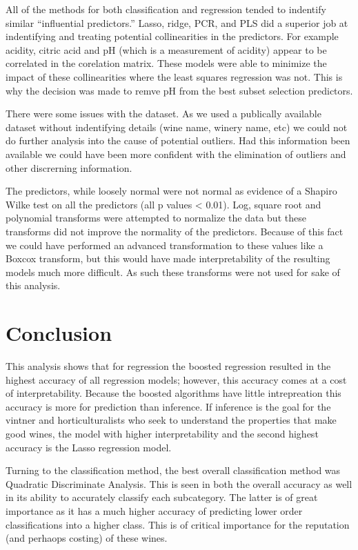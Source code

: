 \documentclass[]{article}
\begin{document}
All of the methods for both classification and regression tended to
indentify similar ``influential predictors.'' Lasso, ridge, PCR, and PLS
did a superior job at indentifying and treating potential collinearities
in the predictors. For example acidity, citric acid and pH (which is a
measurement of acidity) appear to be correlated in the corelation
matrix. These models were able to minimize the impact of these
collinearities where the least squares regression was not. This is why
the decision was made to remve pH from the best subset selection
predictors.

There were some issues with the dataset. As we used a publically
available dataset without indentifying details (wine name, winery name,
etc) we could not do further analysis into the cause of potential
outliers. Had this information been available we could have been more
confident with the elimination of outliers and other discrerning
information.

The predictors, while loosely normal were not normal as evidence of a
Shapiro Wilke test on all the predictors (all p values \textless{}
0.01). Log, square root and polynomial transforms were attempted to
normalize the data but these transforms did not improve the normality of
the predictors. Because of this fact we could have performed an advanced
transformation to these values like a Boxcox transform, but this would
have made interpretability of the resulting models much more difficult.
As such these transforms were not used for sake of this analysis.

\section{Conclusion}\label{conclusion}

This analysis shows that for regression the boosted regression resulted
in the highest accuracy of all regression models; however, this accuracy
comes at a cost of interpretability. Because the boosted algorithms have
little intrepreation this accuracy is more for prediction than
inference. If inference is the goal for the vintner and
horticulturalists who seek to understand the properties that make good
wines, the model with higher interpretability and the second highest
accuracy is the Lasso regression model.

Turning to the classification method, the best overall classification
method was Quadratic Discriminate Analysis. This is seen in both the
overall accuracy as well in its ability to accurately classify each
subcategory. The latter is of great importance as it has a much higher
accuracy of predicting lower order classifications into a higher class.
This is of critical importance for the reputation (and perhaops costing)
of these wines.
\end{document}

